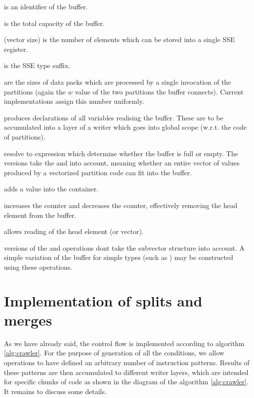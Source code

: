 \begin{description}
  \item {} is an identifier of the buffer.
  \item {} is the total capacity of the buffer.
  \item {} (vector size) is the number of elements which can be stored into a single SSE register.
  \item {} is the SSE type suffix.
  \item {} are the sizes of data packs which are processed by a single invocation of the partitions (again the $w$ value of the two partitions the buffer connects). Current implementations assign this number uniformly.
  \item {} produces declarations of all variables realising the buffer. These are to be accumulated into a layer of a writer which goes into global scope (w.r.t. the code of partitions).
  \item {} resolve to expression which determine whether the buffer is full or empty. The  versions take the  and  into account, meaning whether an entire vector of values produced by a vectorized partition code can fit into the buffer.
  \item {} adds a value into the container.
  \item {} increases the  counter and decreases the  counter, effectively removing the head element from the buffer.
  \item {} allows reading of the head element (or vector).
  \item {} versions of the  and  operations dont take the subvector structure into account. A simple variation of the buffer for simple types (such as ) may be constructed using these operations.
\end{description}

\section{ Implementation of splits and merges }

As we have already said, the control flow is implemented according to algorithm \ref{alg:crawler}. For the purpose of generation of all the conditions, we allow operations to have defined an arbitrary number of instruction patterns. Results of these patterns are then accumulated to different writer layers, which are intended for specific chunks of code as shown in the diagram of the algorithm \ref{alg:crawler}. It remains to discuss some details.

